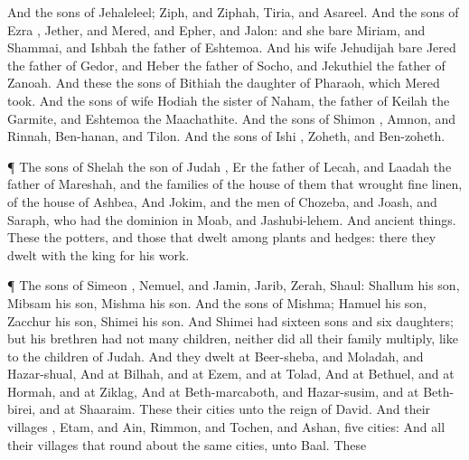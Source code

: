 {And the
sons of
Jehaleleel;
Ziph, and
Ziphah,
Tiria, and
Asareel.
And the
sons of
Ezra
{},
Jether, and
Mered, and
Epher, and
Jalon: and she
bare
Miriam, and
Shammai, and
Ishbah the
father of
Eshtemoa.
And his
wife
Jehudijah
bare
Jered the
father of
Gedor, and
Heber the
father of
Socho, and
Jekuthiel the
father of
Zanoah. And these
{} the
sons of
Bithiah the
daughter of
Pharaoh, which
Mered
took.
And the
sons of
{}
wife
Hodiah the
sister of
Naham, the
father of
Keilah the
Garmite, and
Eshtemoa the
Maachathite.
And the
sons of
Shimon
{},
Amnon, and
Rinnah,
Ben-hanan, and
Tilon. And the
sons of
Ishi
{},
Zoheth, and
Ben-zoheth.
\par }{\PP {}¶ The
sons of
Shelah the
son of
Judah
{},
Er the
father of
Lecah, and
Laadah the
father of
Mareshah, and the
families of the
house of them that
wrought fine
linen, of the
house of
Ashbea,
And
Jokim, and the
men of
Chozeba, and
Joash, and
Saraph, who had the
dominion in
Moab, and
Jashubi-lehem. And
{}
ancient
things.
These
{} the
potters, and those that
dwelt among
plants and
hedges: there they
dwelt with the
king for his
work.
\par }{\PP {}¶ The
sons of
Simeon
{},
Nemuel, and
Jamin,
Jarib,
Zerah,
{}
Shaul:
Shallum his
son,
Mibsam his
son,
Mishma his
son.
And the
sons of
Mishma;
Hamuel his
son,
Zacchur his
son,
Shimei his
son.
And
Shimei had
sixteen
sons and
six
daughters; but his
brethren had not
many
children, neither did all their
family
multiply, like to the
children of
Judah.
And they
dwelt at
Beer-sheba, and
Moladah, and
Hazar-shual,
And at
Bilhah, and at
Ezem, and at
Tolad,
And at
Bethuel, and at
Hormah, and at
Ziklag,
And at
Beth-marcaboth, and
Hazar-susim, and at
Beth-birei, and at
Shaaraim. These
{} their
cities unto the
reign of
David.
And their
villages
{},
Etam, and
Ain,
Rimmon, and
Tochen, and
Ashan,
five
cities:
And all their
villages that
{} round
about the same
cities, unto
Baal. These
}
